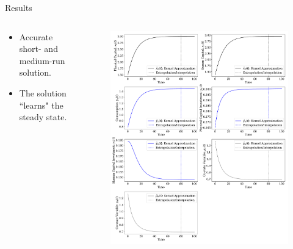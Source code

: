 \documentclass[aspectratio=169,10pt]{beamer}
\begin{document}
\begin{frame}{Results}
			\begin{columns}
			\begin{column}{0.5\textwidth}
				\begin{itemize}
					\item Accurate short- and medium-run solution.
					\vspace{0.05in}
					\item The solution ``learns" the steady state.
				\end{itemize}
			\end{column}
			\begin{column}{0.42\textwidth}
				\begin{figure}[t!]
					\centering
					\includegraphics[width=\textwidth]{figs/neoclassical_human_capital.pdf}
					\vspace{-7mm}
				\end{figure}
			\end{column}
		\end{columns}
\end{frame}
\end{document}
